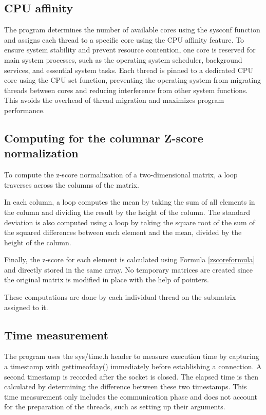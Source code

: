 \documentclass[journal]{./IEEE/IEEEtran}
\begin{document}
\subsection{CPU affinity}
The program determines the number of available cores using the sysconf function and assigns each thread to a specific core using the CPU affinity feature. To ensure system stability and prevent resource contention, one core is reserved for main system processes, such as the operating system scheduler, background services, and essential system tasks. Each thread is pinned to a dedicated CPU core using the CPU set function, preventing the operating system from migrating threads between cores and reducing interference from other system functions. This avoids the overhead of thread migration and maximizes program performance.

\subsection{Computing for the columnar Z-score normalization}
To compute the z-score normalization of a two-dimensional matrix, a loop traverses across the columns of the matrix.

In each column, a loop computes the mean by taking the sum of all elements in the column and dividing the result by the height of the column.
The standard deviation is also computed using a loop by taking the square root of the sum of the squared differences between each element and the mean, divided by the height of the column.

Finally, the z-score for each element is calculated using Formula \ref{zscoreformula} and directly stored in the same array.
No temporary matrices are created since the original matrix is modified in place with the help of pointers.

These computations are done by each individual thread on the submatrix assigned to it.


\subsection{Time measurement}
The program uses the sys/time.h header to measure execution time by capturing a timestamp with gettimeofday() immediately before establishing a connection. A second timestamp is recorded after the socket is closed. The elapsed time is then calculated by determining the difference between these two timestamps. This time measurement only includes the communication phase and does not account for the preparation of the threads, such as setting up their arguments.
\end{document}
